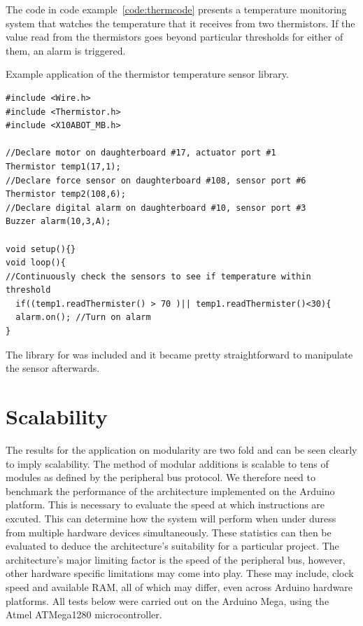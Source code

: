 The code in code example~\ref{code:thermcode} presents a temperature monitoring system that watches the temperature that it receives from two thermistors. If the value read from the thermistors goes beyond particular thresholds for either of them, an alarm is triggered.
\begin{listing}
		\footnotesize
		\caption{Example application of the thermistor temperature sensor library.} \label{code:thermcode}
		\begin{verbatim}
#include <Wire.h>  
#include <Thermistor.h>  
#include <X10ABOT_MB.h>

//Declare motor on daughterboard #17, actuator port #1
Thermistor temp1(17,1);
//Declare force sensor on daughterboard #108, sensor port #6
Thermistor temp2(108,6);
//Declare digital alarm on daughterboard #10, sensor port #3
Buzzer alarm(10,3,A);

void setup(){}
void loop(){
//Continuously check the sensors to see if temperature within threshold
  if((temp1.readThermister() > 70 )|| temp1.readThermister()<30){
  alarm.on(); //Turn on alarm 
}
	\end{verbatim}
		
\end{listing}

The library for was included and it became pretty straightforward to manipulate the sensor afterwards.

\section{Scalability} %
\label{sec:scalability}

The results for the application on modularity are two fold and can be seen clearly to imply scalability. The method of modular additions is scalable to tens of modules as defined by the peripheral bus protocol. We therefore need to benchmark the performance of the architecture implemented on the Arduino platform. This is necessary to evaluate the speed at which instructions are excuted. This can determine how the system will perform when under duress from multiple hardware devices simultaneously. These statistics can then be evaluated to deduce the architecture's suitability for a particular project. The \xten architecture's major limiting factor is the speed of the peripheral bus, however, other hardware specific limitations may come into play. These may include, clock speed and available RAM, all of which may differ, even across Arduino hardware platforms. All tests below were carried out on the Arduino Mega, using the Atmel \texttrademark ATMega1280 microcontroller.

